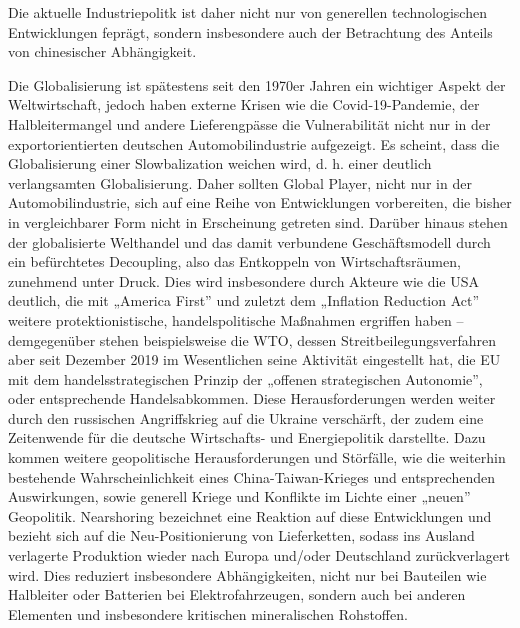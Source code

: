 \documentclass[12pt,a4paper,oneside]{book} %
\begin{document}
	Die aktuelle Industriepolitk ist daher nicht nur von generellen technologischen Entwicklungen feprägt, sondern insbesondere auch der Betrachtung des Anteils von chinesischer Abhängigkeit.
	
	Die Globalisierung ist spätestens seit den 1970er Jahren ein wichtiger Aspekt der Weltwirtschaft, jedoch haben externe Krisen wie die Covid-19-Pandemie, der Halbleitermangel und andere Lieferengpässe die Vulnerabilität nicht nur in der exportorientierten deutschen Automobilindustrie aufgezeigt. Es scheint, dass die Globalisierung einer Slowbalization weichen wird, d. h. einer deutlich verlangsamten Globalisierung. Daher sollten Global Player, nicht nur in der Automobilindustrie, sich auf eine Reihe von Entwicklungen vorbereiten, die bisher in vergleichbarer Form nicht in Erscheinung getreten sind.
	Darüber hinaus stehen der globalisierte Welthandel und das damit verbundene Geschäftsmodell durch ein befürchtetes Decoupling, also das Entkoppeln von Wirtschaftsräumen, zunehmend unter Druck. Dies wird insbesondere durch Akteure wie die USA deutlich, die mit „America First” und zuletzt dem „Inflation Reduction Act” weitere protektionistische, handelspolitische Maßnahmen ergriffen haben – demgegenüber stehen beispielsweise die WTO, dessen Streitbeilegungsverfahren aber seit Dezember 2019 im Wesentlichen seine Aktivität eingestellt hat, die EU mit dem handelsstrategischen Prinzip der „offenen strategischen Autonomie”, oder entsprechende Handelsabkommen. Diese Herausforderungen werden weiter durch den russischen Angriffskrieg auf die Ukraine verschärft, der zudem eine Zeitenwende für die deutsche Wirtschafts- und Energiepolitik darstellte. Dazu kommen weitere geopolitische Herausforderungen und Störfälle, wie die weiterhin bestehende Wahrscheinlichkeit eines China-Taiwan-Krieges und entsprechenden Auswirkungen, sowie generell Kriege und Konflikte im Lichte einer „neuen” Geopolitik. Nearshoring bezeichnet eine Reaktion auf diese Entwicklungen und bezieht sich auf die Neu-Positionierung von Lieferketten, sodass ins Ausland verlagerte Produktion wieder nach Europa und/oder Deutschland zurückverlagert wird. Dies reduziert insbesondere Abhängigkeiten, nicht nur bei Bauteilen wie Halbleiter oder Batterien bei Elektrofahrzeugen, sondern auch bei anderen Elementen und insbesondere kritischen mineralischen Rohstoffen.
	
\end{document}
